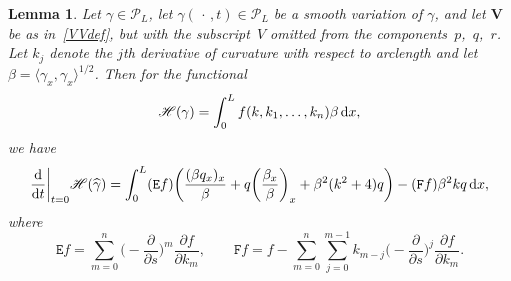 \documentclass[pdftex]{sigma}
\newcommand\Leg{ {\mathcal P}} %
\def\Fop{\mathtt F} %
\def\Euler{\mathtt E}
\newcommand\kk{k} %
\newcommand\speed{\beta} %
\newcommand\VV{\mathbf V}
\newcommand\funH{{\mathscr H}} %
\newcommand{\dx}{\,{\rm d}x}
\def\gam{\gamma} %
\def\di{\partial}
\newcommand\gamf{\widehat{\gam}} %
\numberwithin{equation}{section}
\newtheorem{Lemma}[Theorem]{Lemma}
\begin{document}
\begin{Lemma}\label{grunge} Let $\gam \in \Leg_L$, let $\gamf(\, \cdot\, ,t)\in \Leg_L$ be a smooth variation of $\gam$, and let $\VV$ be as
in~\eqref{VVdef}, but with the subscript~$V$ omitted from the components~$p$,~$q$,~$r$. Let $\kk_j$ denote the $j$th derivative of curvature with respect to arclength and let $\speed = \langle \gam_x, \gam_x \rangle^{1/2}$. Then for the functional
\[
\funH(\gam) = \int_0^L f(\kk, \kk_1, \ldots, \kk_n) \speed \dx,
\]
we have
\[
\dfrac{{\rm d}}{{\rm d}t}\bigg|_{t=0} \funH(\gamf)
=\int_{0}^{L} (\Euler f)\biggl( \dfrac{(\speed q_x)_x}{\speed}
+ q\biggl( \dfrac{\speed_x}{\speed}\biggr)_x
+ \speed^2(\kk^2 + 4) q\biggr) - (\Fop f) \speed^2 k q \dx,
\]
where
\[
\Euler f = \sum_{m=0}^n \biggl(- \dfrac{\di}{\di s}\biggr)^m \dfrac{\partial f}{\partial \kk_m}, \qquad
\Fop f = f - \sum_{m=0}^n \sum_{j=0}^{m-1}\kk_{m-j}\biggl(- \dfrac{\di}{\di s}\biggr)^j \dfrac{\partial f}{\partial \kk_m}.
\]
\end{Lemma}
\end{document}
